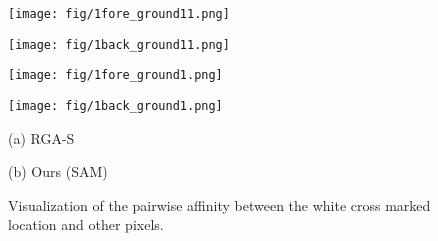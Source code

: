 \begin{figure}[!t] 
\begin{minipage}{0.24\linewidth}
\centerline{\texttt{[image: fig/1fore\_ground11.png]}}
\end{minipage}
\begin{minipage}{0.24\linewidth}
\centerline{\texttt{[image: fig/1back\_ground11.png]}}
\end{minipage}
\hspace{0.1mm}
\begin{minipage}{0.24\linewidth}
\centerline{\texttt{[image: fig/1fore\_ground1.png]}}
\end{minipage}
\begin{minipage}{0.24\linewidth}
\centerline{\texttt{[image: fig/1back\_ground1.png]}}
\end{minipage}

\begin{minipage}{0.486\linewidth}
\centerline{\footnotesize (a) RGA-S~\cite{zhang2020relation}}
\end{minipage}
\begin{minipage}{0.486\linewidth}
\centerline{\footnotesize (b) Ours (SAM)}
\end{minipage}
\caption{Visualization of the pairwise affinity between the white cross marked location and other pixels.}
\label{fig:SAM}
\end{figure}

